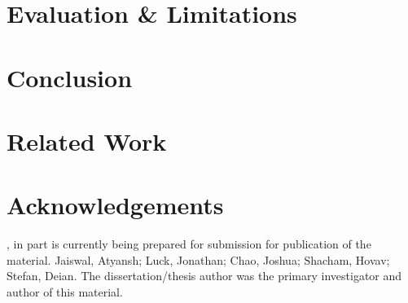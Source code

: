 \section{Evaluation \& Limitations}

\section{Conclusion}
\label{sec:conclusion-saber}

\section{Related Work}
\label{sec:related-saber}

\section{Acknowledgements}
\label{sec:acknowledgement-saber}
, in part is currently being prepared for submission for
publication of the material. Jaiswal, Atyansh; Luck, Jonathan; Chao, Joshua;
Shacham, Hovav; Stefan, Deian. The dissertation/thesis author was the primary
investigator and author of this material.
